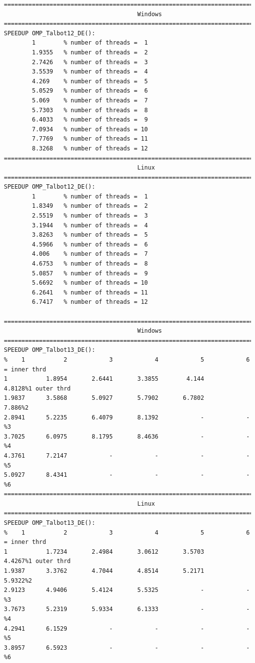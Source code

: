 \documentclass[a4paper,10pt]{report}%
\begin{document}
\begin{lstlisting}
====================================================================================
                                      Windows
====================================================================================
SPEEDUP OMP_Talbot12_DE():
        1        % number of threads =  1
        1.9355   % number of threads =  2
        2.7426   % number of threads =  3
        3.5539   % number of threads =  4
        4.269    % number of threads =  5
        5.0529   % number of threads =  6
        5.069    % number of threads =  7
        5.7303   % number of threads =  8
        6.4033   % number of threads =  9
        7.0934   % number of threads = 10
        7.7769   % number of threads = 11
        8.3268   % number of threads = 12
====================================================================================
                                      Linux
====================================================================================
SPEEDUP OMP_Talbot12_DE():
        1        % number of threads =  1
        1.8349   % number of threads =  2
        2.5519   % number of threads =  3
        3.1944   % number of threads =  4
        3.8263   % number of threads =  5
        4.5966   % number of threads =  6
        4.006    % number of threads =  7
        4.6753   % number of threads =  8
        5.0857   % number of threads =  9
        5.6692   % number of threads = 10
        6.2641   % number of threads = 11
        6.7417   % number of threads = 12

====================================================================================
                                      Windows
====================================================================================
SPEEDUP OMP_Talbot13_DE():
%    1           2            3            4            5            6 = inner thrd
1           1.8954       2.6441       3.3855        4.144       4.8128%1 outer thrd
1.9837      3.5868       5.0927       5.7902       6.7802        7.886%2
2.8941      5.2235       6.4079       8.1392            -            -%3
3.7025      6.0975       8.1795       8.4636            -            -%4
4.3761      7.2147            -            -            -            -%5
5.0927      8.4341            -            -            -            -%6
====================================================================================
                                      Linux
====================================================================================
SPEEDUP OMP_Talbot13_DE():
%    1           2            3            4            5            6 = inner thrd
1           1.7234       2.4984       3.0612       3.5703       4.4267%1 outer thrd
1.9387      3.3762       4.7044       4.8514       5.2171       5.9322%2
2.9123      4.9406       5.4124       5.5325            -            -%3
3.7673      5.2319       5.9334       6.1333            -            -%4
4.2941      6.1529            -            -            -            -%5
3.8957      6.5923            -            -            -            -%6
\end{lstlisting}
\end{document}
